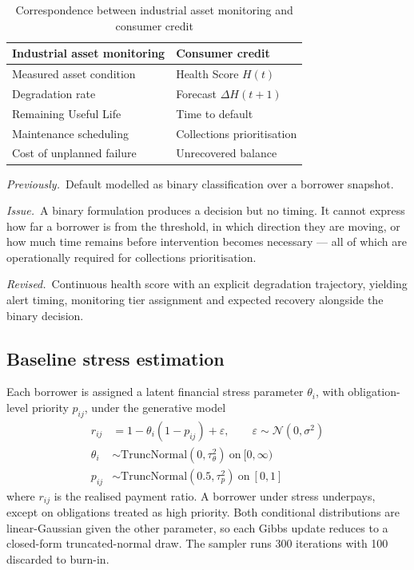 \documentclass[11pt,a4paper]{article}
\newcommand{\designnote}[3]{%
  \par\vspace{7pt}
  \begin{list}{}{%
    \setlength{\leftmargin}{2em}\setlength{\rightmargin}{1em}%
    \setlength{\labelwidth}{0pt}\setlength{\labelsep}{0pt}%
    \setlength{\itemsep}{2pt}\setlength{\topsep}{0pt}%
    \setlength{\parsep}{0pt}}
    \item[]\textit{Previously.}~#1
    \item[]\textit{Issue.}~#2
    \item[]\textit{Revised.}~#3
  \end{list}
  \par\vspace{7pt}
}
\begin{document}
\begin{table}[H]
\centering
\caption{Correspondence between industrial asset monitoring and consumer credit}
\begin{tabular}{ll}
\toprule
\textbf{Industrial asset monitoring} & \textbf{Consumer credit} \\
\midrule
Measured asset condition & Health Score $H(t)$ \\
Degradation rate & Forecast $\Delta H(t{+}1)$ \\
Remaining Useful Life & Time to default \\
Maintenance scheduling & Collections prioritisation \\
Cost of unplanned failure & Unrecovered balance \\
\bottomrule
\end{tabular}
\end{table}

\designnote{Default modelled as binary classification over a borrower snapshot.}
{A binary formulation produces a decision but no timing. It cannot express how far a
borrower is from the threshold, in which direction they are moving, or how much time
remains before intervention becomes necessary --- all of which are operationally
required for collections prioritisation.}
{Continuous health score with an explicit degradation trajectory, yielding alert timing,
monitoring tier assignment and expected recovery alongside the binary decision.}

\subsection{Baseline stress estimation}

Each borrower is assigned a latent financial stress parameter $\theta_i$, with
obligation-level priority $p_{ij}$, under the generative model
\begin{align}
r_{ij} &= 1 - \theta_i(1 - p_{ij}) + \varepsilon, \qquad \varepsilon \sim \mathcal{N}(0,\sigma^2) \\
\theta_i &\sim \mathrm{TruncNormal}(0, \tau_\theta^2) \ \text{on} \ [0,\infty) \\
p_{ij} &\sim \mathrm{TruncNormal}(0.5, \tau_p^2) \ \text{on} \ [0,1]
\end{align}
where $r_{ij}$ is the realised payment ratio. A borrower under stress underpays, except
on obligations treated as high priority. Both conditional distributions are
linear-Gaussian given the other parameter, so each Gibbs update reduces to a closed-form
truncated-normal draw. The sampler runs 300 iterations with 100 discarded to burn-in.
\end{document}
